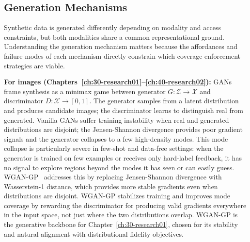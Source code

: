 \subsection{Generation Mechanisms} \label{sec:25-background-distribution-mechanisms}
\begin{foldable}
  Synthetic data is generated differently depending on modality and access constraints, but both modalities share a common representational ground.
  Understanding the generation mechanism matters because the affordances and failure modes of each mechanism directly constrain which coverage-enforcement strategies are viable.
\end{foldable}

\begin{foldable}
  \textbf{For images (Chapters~\ref{ch:30-research01}--\ref{ch:40-research02}):}
  \Acp{GAN}~\cite{goodfellow2014generative} frame synthesis as a minimax game between generator $G: \mathcal{Z} \to \mathcal{X}$ and discriminator $D: \mathcal{X} \to [0,1]$.
  The generator samples from a latent distribution and produces candidate images; the discriminator learns to distinguish real from generated.
  Vanilla GANs suffer training instability when real and generated distributions are disjoint; the Jensen-Shannon divergence provides poor gradient signals and the generator collapses to a few high-density modes.
  This mode collapse is particularly severe in few-shot and data-free settings: when the generator is trained on few examples or receives only hard-label feedback, it has no signal to explore regions beyond the modes it has seen or can easily guess.
  \Ac{WGAN-GP}~\cite{gulrajani2017improved} addresses this by replacing Jensen-Shannon divergence with Wasserstein-1 distance, which provides more stable gradients even when distributions are disjoint.
  \Ac{WGAN-GP} stabilizes training and improves mode coverage by rewarding the discriminator for producing valid gradients everywhere in the input space, not just where the two distributions overlap.
  \Ac{WGAN-GP} is the generative backbone for Chapter~\ref{ch:30-research01}, chosen for its stability and natural alignment with distributional fidelity objectives.
\end{foldable}

